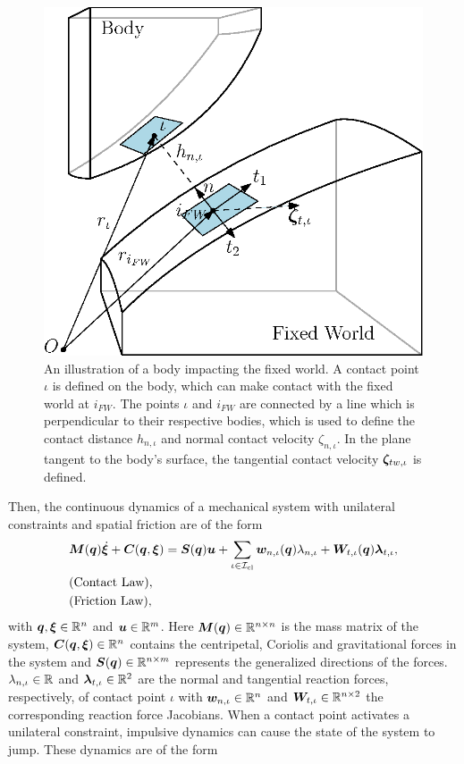 \documentclass[../DC2017114Bouma.tex]{subfiles}
\begin{document}
\begin{figure}[h]
\centering
\includegraphics[width=.5\textwidth]{contactplanes.eps}\caption{An illustration of a body impacting the fixed world. A contact point $\iota$ is defined on the body, which can make contact with the fixed world at $i_{FW}$. The points $\iota$ and $i_{FW}$ are connected by a line which is perpendicular to their respective bodies, which is used to define the contact distance $h_{n,\iota}$ and normal contact velocity $\zeta_{n,\iota}$. In the plane tangent to the body's surface, the tangential contact velocity $\boldsymbol{\zeta}_{tw,\iota}$ is defined.} \label{fig:contactplanes}
\end{figure}

Then, the continuous dynamics of a mechanical system with unilateral constraints and spatial friction are of the form
\begin{align}
&{\boldsymbol{M}}({\boldsymbol{q}})\dot{\boldsymbol{\xi}} + {\boldsymbol{C}}({\boldsymbol{q}},\boldsymbol{\xi}) = {\boldsymbol{S}}({\boldsymbol{q}}){\boldsymbol{u}} + \sum_{\iota\in\mathcal{I}_{\text{cl}}}{\boldsymbol{w}}_{n,\iota}({\boldsymbol{q}})\lambda_{n,\iota} + {\boldsymbol{W}}_{t,\iota}({\boldsymbol{q}})\boldsymbol{\lambda}_{t,\iota}, \label{eq:appcont1}\\
&\text{(Contact Law)},\nonumber\\
&\text{(Friction Law)},\nonumber
\end{align}
%
%
%
%
%
%
%
with ${\boldsymbol{q}},\boldsymbol{\xi}\in\mathbb{R}^{n}$ and ${\boldsymbol{u}}\in\mathbb{R}^m$. Here ${\boldsymbol{M}}({\boldsymbol{q}})\in\mathbb{R}^{n\times n}$ is the mass matrix of the system, ${\boldsymbol{C}}({\boldsymbol{q}},\boldsymbol{\xi})\in\mathbb{R}^{n}$ contains the centripetal, Coriolis and gravitational forces in the system and ${\boldsymbol{S}}({\boldsymbol{q}})\in\mathbb{R}^{n\times m}$ represents the generalized directions of the forces. $\lambda_{n,\iota}\in\mathbb{R}$ and $\boldsymbol{\lambda}_{t,\iota}\in\mathbb{R}^{2}$ are the normal and tangential reaction forces, respectively, of contact point $\iota$ with ${\boldsymbol{w}}_{n,\iota}\in\mathbb{R}^{n}$ and ${\boldsymbol{W}}_{t,\iota}\in\mathbb{R}^{n\times 2}$ the corresponding reaction force Jacobians. When a contact point activates a unilateral constraint, impulsive dynamics can cause the state of the system to jump. These dynamics are of the form
\end{document}
